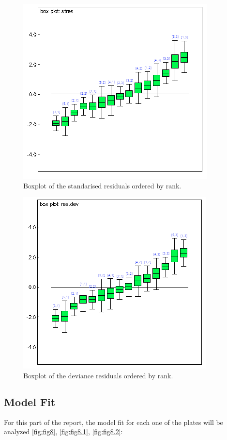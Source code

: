 \documentclass{article}
\begin{document}
  \begin{figure}[ht!]
  \centering
  \includegraphics[width=.45\textwidth]{Figures/6.png}
  \caption{Boxplot of the standarised residuals ordered by rank.}
  \label{fig:fig6}
  \end{figure}
  
  \begin{figure}[ht!]
  \centering
  \includegraphics[width=.45\textwidth]{Figures/7.png}
  \caption{Boxplot of the deviance residuals ordered by rank.}
  \label{fig:fig7}
  \end{figure}

\newpage
\subsection{Model Fit}
For this part of the report, the model fit for each one of the plates will be analyzed \cref{fig:fig8}, \cref{fig:fig8.1}, \cref{fig:fig8.2}:
\end{document}
